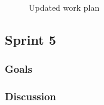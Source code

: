 \begin{center}
  \begin{figure}[ht!]
    \caption{Updated work plan}
    \label{fig:workplan, revised}
  \end{figure}
\end{center}

\subsection{Sprint 5}

\subsubsection{Goals}

\subsubsection{Discussion}

\clearpage